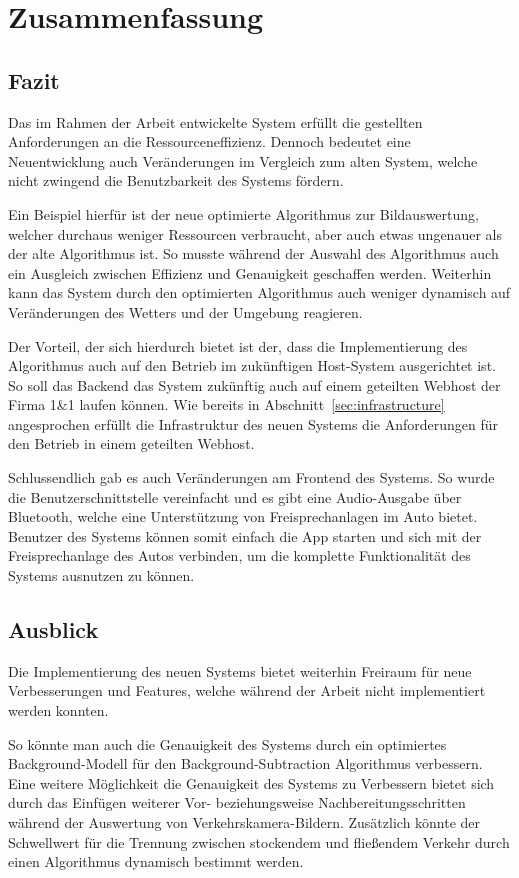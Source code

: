 \chapter{Zusammenfassung}

\section{Fazit}
Das im Rahmen der Arbeit entwickelte System erfüllt die gestellten Anforderungen an die Ressourceneffizienz.
Dennoch bedeutet eine Neuentwicklung auch Veränderungen im Vergleich zum alten System, welche nicht zwingend die Benutzbarkeit des Systems fördern.

Ein Beispiel hierfür ist der neue optimierte Algorithmus zur Bildauswertung, welcher durchaus weniger Ressourcen verbraucht, aber auch etwas ungenauer als der alte Algorithmus ist.
So musste während der Auswahl des Algorithmus auch ein Ausgleich zwischen Effizienz und Genauigkeit geschaffen werden.
Weiterhin kann das System durch den optimierten Algorithmus auch weniger dynamisch auf Veränderungen des Wetters und der Umgebung reagieren.

Der Vorteil, der sich hierdurch bietet ist der, dass die Implementierung des Algorithmus auch auf den Betrieb im zukünftigen Host-System ausgerichtet ist.
So soll das Backend das System zukünftig auch auf einem geteilten Webhost der Firma 1\&1 laufen können.
Wie bereits in Abschnitt~\ref{sec:infrastructure} angesprochen erfüllt die Infrastruktur des neuen Systems die Anforderungen für den Betrieb in einem geteilten Webhost.

Schlussendlich gab es auch Veränderungen am Frontend des Systems.
So wurde die Benutzerschnittstelle vereinfacht und es gibt eine Audio-Ausgabe über Bluetooth, welche eine Unterstützung von Freisprechanlagen im Auto bietet.
Benutzer des Systems können somit einfach die App starten und sich mit der Freisprechanlage des Autos verbinden, um die komplette Funktionalität des Systems ausnutzen zu können.
\newpage

\section{Ausblick}
Die Implementierung des neuen Systems bietet weiterhin Freiraum für neue Verbesserungen und Features, welche während der Arbeit nicht implementiert werden konnten.

So könnte man auch die Genauigkeit des Systems durch ein optimiertes Background-Modell für den Background-Subtraction Algorithmus verbessern.
Eine weitere Möglichkeit die Genauigkeit des Systems zu Verbessern bietet sich durch das Einfügen weiterer Vor- beziehungsweise Nachbereitungsschritten während der Auswertung von Verkehrskamera-Bildern.
Zusätzlich könnte der Schwellwert für die Trennung zwischen stockendem und fließendem Verkehr durch einen Algorithmus dynamisch bestimmt werden.

